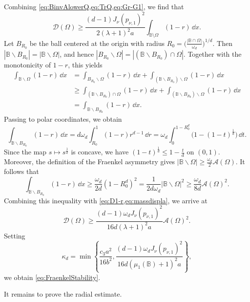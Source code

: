 \documentclass{amsart}
\numberwithin{equation}{section}
\theoremstyle{plain}
\theoremstyle{definition}
\theoremstyle{plain}
\theoremstyle{remark}
\numberwithin{figure}{section}
\newcommand{\B}{\mathbb{B}}
\newcommand{\D}{\mathcal{D}(\Omega)}
\newcommand{\A}{\mathcal{A}(\Omega)}
\begin{document}
Combining \cref{eq:BinvAlowerQ,eq:TrQ,eq:Gr-G1}, we find that
\begin{equation}
    \label{eq:D1-r}
    \D \geq \frac{(d-1) J_\nu(p_{\nu,1})^2}{2(\lambda+1)^2a} \int_{\B\setminus\Omega}(1-r)\,\dd x.
\end{equation}
Let $B_{R_0}$ be the ball centered at the origin with radius $R_0 = \big(\frac{|\B\cap \Omega|}{\omega_d}\big)^{1/d}$. Then $|\B\backslash B_{R_0}|=|\B\backslash \Omega|$, and hence $|B_{R_0}\backslash\Omega|=|(\B\backslash B_{R_0})\cap\Omega|$. Together with the monotonicity of $1-r$, this yields
\begin{equation}
\label{eq:massdispla}
\begin{aligned}
    \int_{\B\backslash\Omega} (1-r)\,\dd x & = \int_{B_{R_0}\backslash\Omega}(1-r)\,\dd x + \int_{(\B\backslash B_{R_0})\backslash\Omega}(1-r)\,\dd x \\
    & \geq \int_{(\B\backslash B_{R_0})\cap\Omega}(1-r)\,\dd x + \int_{(\B\backslash B_{R_0})\backslash\Omega}(1-r)\,\dd x \\
    & = \int_{\B\backslash B_{R_0}} (1-r)\,\dd x.
\end{aligned}
\end{equation}
Passing to polar coordinates, we obtain
\[
    \int_{\B\backslash B_{R_0}} (1-r)\,\dd x = d\omega_d \int_{R_0}^{1} (1-r)r^{d-1} \,\dd r = \omega_d \int_{0}^{1-R_0^d}\big(1-(1-t)^{\frac{1}{d}}\big) \,\dd t.
\]
Since the map $s\mapsto s^{\frac{1}{d}}$ is concave, we have $(1-t)^{\frac{1}{d}}\leq 1-\frac{t}{d}$ on $(0,1)$. Moreover, the definition of the Fraenkel asymmetry gives $|\B\backslash\Omega|\geq\frac{\omega_d}{2}\A$. It follows that
\[
    \int_{\B\backslash B_{R_0}} (1-r)\,\dd x \geq \frac{\omega_d}{2d}(1-R_0^d)^2 = \frac{1}{2d\omega_d}|\B\backslash\Omega|^2\geq \frac{\omega_d}{8d}\A^2.
\]
Combining this inequality with \cref{eq:D1-r,eq:massdispla}, we arrive at
\[
    \D \geq \frac{(d-1)\omega_d J_{\nu}(p_{\nu,1})^2}{16d(\lambda+1)^2a}\A^2.
\]
Setting
\begin{equation}
    \label{eq:kappad}
    \kappa_d = \min\left\{\frac{c_3a^2}{16b^2}, \frac{(d-1)\omega_d J_{\nu}(p_{\nu,1})^2}{16d(\mu_1(\B)+1)^2a}\right\},
\end{equation}
we obtain \cref{eq:FraenkelStability}. 

It remains to prove the radial estimate.
\end{document}
